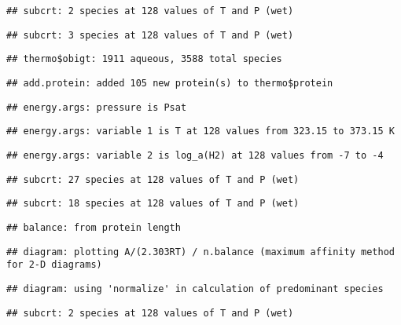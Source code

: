 \documentclass[]{article}
\begin{document}
\begin{verbatim}
## subcrt: 2 species at 128 values of T and P (wet)
\end{verbatim}

\begin{verbatim}
## subcrt: 3 species at 128 values of T and P (wet)
\end{verbatim}

\begin{verbatim}
## thermo$obigt: 1911 aqueous, 3588 total species
\end{verbatim}

\begin{verbatim}
## add.protein: added 105 new protein(s) to thermo$protein
\end{verbatim}

\begin{verbatim}
## energy.args: pressure is Psat
\end{verbatim}

\begin{verbatim}
## energy.args: variable 1 is T at 128 values from 323.15 to 373.15 K
\end{verbatim}

\begin{verbatim}
## energy.args: variable 2 is log_a(H2) at 128 values from -7 to -4
\end{verbatim}

\begin{verbatim}
## subcrt: 27 species at 128 values of T and P (wet)
\end{verbatim}

\begin{verbatim}
## subcrt: 18 species at 128 values of T and P (wet)
\end{verbatim}

\begin{verbatim}
## balance: from protein length
\end{verbatim}

\begin{verbatim}
## diagram: plotting A/(2.303RT) / n.balance (maximum affinity method for 2-D diagrams)
\end{verbatim}

\begin{verbatim}
## diagram: using 'normalize' in calculation of predominant species
\end{verbatim}

\begin{verbatim}
## subcrt: 2 species at 128 values of T and P (wet)
\end{verbatim}
\end{document}

